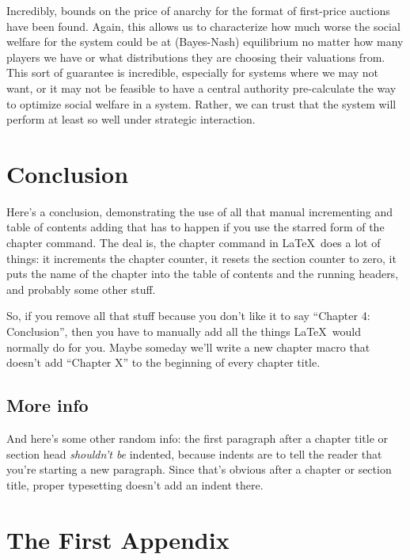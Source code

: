 \documentclass[12pt,twoside]{reedthesis}
\begin{document}
Incredibly, bounds on the price of anarchy for the format of first-price auctions have been found. Again, this allows us to characterize how much worse the social welfare for the system could be at (Bayes-Nash) equilibrium no matter how many players we have or what distributions they are choosing their valuations from. This sort of guarantee is incredible, especially for systems where we may not want, or it may not be feasible to have a central authority pre-calculate the way to optimize social welfare in a system. Rather, we can trust that the system will perform at least so well under strategic interaction.

\chapter*{Conclusion}
	\setcounter{chapter}{4}
	\setcounter{section}{0}
	
Here's a conclusion, demonstrating the use of all that manual incrementing and table of contents adding that has to happen if you use the starred form of the chapter command. The deal is, the chapter command in \LaTeX\ does a lot of things: it increments the chapter counter, it resets the section counter to zero, it puts the name of the chapter into the table of contents and the running headers, and probably some other stuff. 

So, if you remove all that stuff because you don't like it to say ``Chapter 4: Conclusion'', then you have to manually add all the things \LaTeX\ would normally do for you. Maybe someday we'll write a new chapter macro that doesn't add ``Chapter X'' to the beginning of every chapter title.

\section{More info}
And here's some other random info: the first paragraph after a chapter title or section head \emph{shouldn't be} indented, because indents are to tell the reader that you're starting a new paragraph. Since that's obvious after a chapter or section title, proper typesetting doesn't add an indent there. 


    \appendix
      \chapter{The First Appendix}
\end{document}
